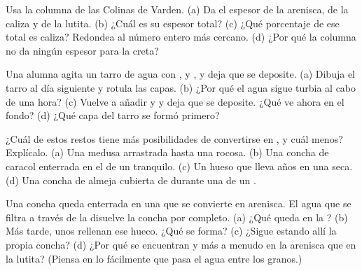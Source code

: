 \begin{exercise}[$\star\star$]\label{exo:g7:sediments-and-fossils:5}
Usa la columna de las Colinas de Varden. (a) Da el espesor de la arenisca,
de la caliza y de la lutita. (b) ¿Cuál es su espesor total? (c) ¿Qué
porcentaje de ese total es caliza? Redondea al número entero más cercano.
(d) ¿Por qué la columna no da ningún espesor para la creta?
\end{exercise}

\begin{exercise}[$\star\star$]\label{exo:g7:sediments-and-fossils:6}
Una alumna agita un tarro de agua con ,  y , y deja que se
deposite. (a) Dibuja el tarro al día siguiente y rotula las capas. (b) ¿Por
qué el agua sigue turbia al cabo de una hora? (c) Vuelve a añadir  y
 y deja que se deposite. ¿Qué ve ahora en el fondo? (d) ¿Qué capa del
tarro se formó primero?
\end{exercise}

\begin{exercise}[$\star\star$]\label{exo:g7:sediments-and-fossils:7}
¿Cuál de estos restos tiene más posibilidades de convertirse en , y
cuál menos? Explícalo. (a) Una medusa arrastrada hasta una  rocosa.
(b) Una concha de caracol enterrada en el  de un  tranquilo.
(c) Un hueso que lleva años en una  seca. (d) Una concha de almeja
cubierta de  durante una  de un .
\end{exercise}

\begin{exercise}[$\star\star$]\label{exo:g7:sediments-and-fossils:8}
Una concha queda enterrada en una  que se convierte en arenisca. El
agua que se filtra a través de la  disuelve la concha por completo.
(a) ¿Qué queda en la ? (b) Más tarde, unos  rellenan ese
hueco. ¿Qué se forma? (c) ¿Sigue estando allí la propia concha? (d) ¿Por
qué se encuentran  y  más a menudo en la arenisca que en
la lutita? (Piensa en lo fácilmente que pasa el agua entre los granos.)
\end{exercise}

